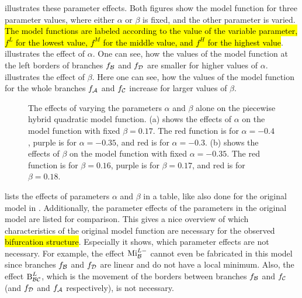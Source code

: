  illustrates these parameter effects.
Both figures show the model function for three parameter values, where either $\alpha$ or $\beta$ is fixed, and the other parameter is varied.
\hl{The model functions are labeled according to the value of the variable parameter, $f^L$ for the lowest value, $f^M$ for the middle value, and $f^H$ for the highest value}.
 illustrates the effect of $\alpha$.
One can see, how the values of the model function at the left borders of branches $f_{\mathcal{B}}$ and $f_{\mathcal{D}}$ are smaller for higher values of $\alpha$.
 illustrates the effect of $\beta$.
Here one can see, how the values of the model function for the whole branches $f_{\mathcal{A}}$ and $f_{\mathcal{C}}$ increase for larger values of $\beta$.

\begin{figure}
	\centering
	\caption[The effects of single parameters on the piecewise hybrid quadratic model function]{
		The effects of varying the parameters $\alpha$ and $\beta$ alone on the piecewise hybrid quadratic model function.
		(a) shows the effects of $\alpha$ on the model function with fixed $\beta = 0.17$.
		The red function is for $\alpha = -0.4$, purple is for $\alpha = -0.35$, and red is for $\alpha = -0.3$.
		(b) shows the effects of $\beta$ on the model function with fixed $\alpha = -0.35$.
		The red function is for $\beta = 0.16$, purple is for $\beta = 0.17$, and red is for $\beta = 0.18$.
	}
	\label{fig:setup.arch.paramfx}
\end{figure}

 lists the effects of parameters $\alpha$ and $\beta$ in a table, like also done for the original model in .
Additionally, the parameter effects of the parameters in the original model are listed for comparison.
This gives a nice overview of which characteristics of the original model function are necessary for the observed \hl{bifurcation structure}.
Especially it shows, which parameter effects are not necessary.
For example, the effect $\operatorname{Mi}_{\mathcal{B}}^{L-}$ cannot even be fabricated in this model since branches $f_{\mathcal{B}}$ and $f_{\mathcal{D}}$ are linear and do not have a local minimum.
Also, the effect $\operatorname{B}_{\mathcal{B}\mathcal{C}}^L$, which is the movement of the borders between branches $f_{\mathcal{B}}$ and $f_{\mathcal{C}}$ (and $f_{\mathcal{D}}$ and $f_{\mathcal{A}}$ respectively), is not necessary.

